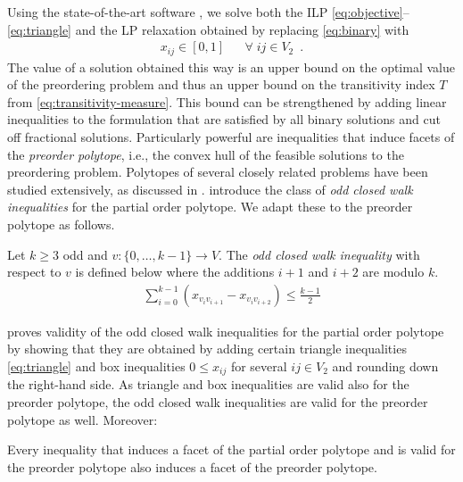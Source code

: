Using the state-of-the-art software \citet{gurobi}, we solve both the ILP \eqref{eq:objective}--\eqref{eq:triangle} and the LP relaxation obtained by replacing \eqref{eq:binary} with 
\begin{align}\label{eq:continuous}
    x_{ij} \in [0,1] && \forall \; ij \in V_2 \enspace .
\end{align}
The value of a solution obtained this way is an upper bound on the optimal value of the preordering problem and thus an upper bound on the transitivity index $T$ from \eqref{eq:transitivity-measure}.
This bound can be strengthened by adding linear inequalities to the formulation that are satisfied by all binary solutions and cut off fractional solutions.
Particularly powerful are inequalities that induce facets of the \emph{preorder polytope}, i.e., the convex hull of the feasible solutions to the preordering problem.
Polytopes of several closely related problems have been studied extensively, as discussed in .
\citet{muller1996partial} introduce the class of \emph{odd closed walk inequalities} for the partial order polytope.
We adapt these to the preorder polytope as follows.

\begin{definition}
    Let $k \geq 3$ odd and $v\colon \{0,\dots,k-1\} \to V$.
    The \emph{odd closed walk inequality} with respect to $v$ is defined below
    where the additions $i+1$ and $i+2$ are modulo $k$.    
    \begin{align}\label{eq:odd-closed-walk}
        \sum_{i = 0}^{k-1} \left( x_{v_iv_{i+1}} - x_{v_iv_{i+2}} \right) \leq \frac{k-1}{2}
    \end{align}
\end{definition}

\citet{muller1996partial} proves validity of the odd closed walk inequalities for the partial order polytope by showing that they are obtained by adding certain triangle inequalities \eqref{eq:triangle} and box inequalities $0 \leq x_{ij}$ for several $ij \in V_2$ and rounding down the right-hand side.
As triangle and box inequalities are valid also for the preorder polytope, the odd closed walk inequalities are valid for the preorder polytope as well.
Moreover:

\begin{lemma}\label{lem:inherited-facets}
    Every inequality that induces a facet of the partial order polytope and is valid for the preorder polytope also induces a facet of the preorder polytope.
\end{lemma}

